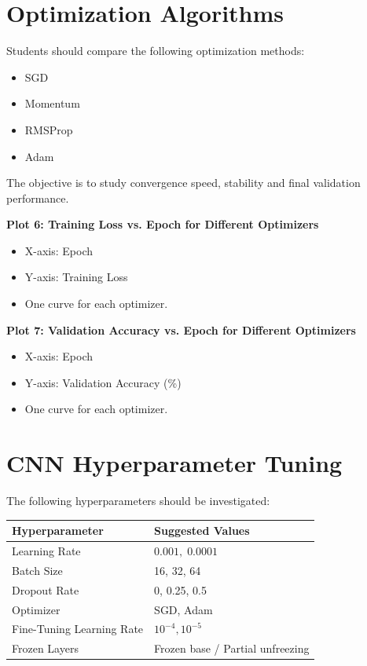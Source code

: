 \documentclass[10pt]{article}
\begin{document}
\section{Optimization Algorithms}

Students should compare the following optimization methods:

\begin{itemize}
\item SGD
\item Momentum
\item RMSProp
\item Adam
\end{itemize}

The objective is to study convergence speed, stability and final
validation performance.

\textbf{Plot 6: Training Loss vs. Epoch for Different Optimizers}

\begin{itemize}
\item X-axis: Epoch
\item Y-axis: Training Loss
\item One curve for each optimizer.
\end{itemize}

\textbf{Plot 7: Validation Accuracy vs. Epoch for Different Optimizers}

\begin{itemize}
\item X-axis: Epoch
\item Y-axis: Validation Accuracy (\%)
\item One curve for each optimizer.
\end{itemize}



\section{CNN Hyperparameter Tuning}

The following hyperparameters should be investigated:

\begin{center}
\begin{tabular}{|l|l|}
\hline
Hyperparameter & Suggested Values\\
\hline
Learning Rate & $0.001,\;0.0001$\\
Batch Size & 16, 32, 64\\
Dropout Rate & 0, 0.25, 0.5\\
Optimizer & SGD, Adam\\
Fine-Tuning Learning Rate & $10^{-4},10^{-5}$\\
Frozen Layers & Frozen base / Partial unfreezing\\
\hline
\end{tabular}
\end{center}
\end{document}
